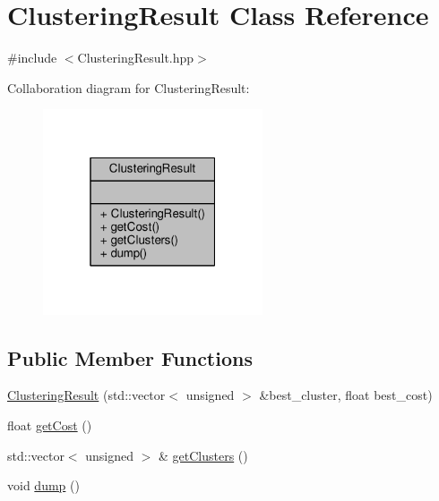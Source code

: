 \hypertarget{classClusteringResult}{\section{Clustering\-Result Class Reference}
\label{classClusteringResult}
}


{\ttfamily \#include $<$Clustering\-Result.\-hpp$>$}



Collaboration diagram for Clustering\-Result\-:\nopagebreak
\begin{figure}[H]
\begin{center}
\leavevmode
\includegraphics[width=184pt]{classClusteringResult__coll__graph}
\end{center}
\end{figure}
\subsection*{Public Member Functions}
\begin{DoxyCompactItemize}
\item 
\hyperlink{classClusteringResult_ac1d9e6b475295cea6b87dd3d85f55d37}{Clustering\-Result} (std\-::vector$<$ unsigned $>$ \&best\-\_\-cluster, float best\-\_\-cost)
\item 
float \hyperlink{classClusteringResult_aa347d753942ad533e8a1638c368769dd}{get\-Cost} ()
\item 
std\-::vector$<$ unsigned $>$ \& \hyperlink{classClusteringResult_a26acf557d1e3924438e813bd16e43f02}{get\-Clusters} ()
\item 
void \hyperlink{classClusteringResult_a9e2e35d23e98d1e89d07a4ac5223925c}{dump} ()
\end{DoxyCompactItemize}


